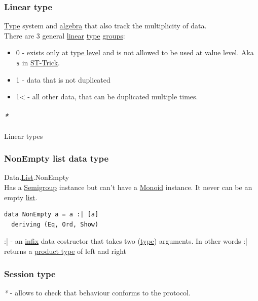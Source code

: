 \documentclass[11pt]{article}
\begin{document}
\subsubsection{\label{orge646ddd}Linear type}
\label{sec:org67a4dab}
\hyperref[orgc4aea2f]{Type} system and \hyperref[orgecfec51]{algebra} that also track the multiplicity of data.\\
There are 3 general \hyperref[orgbbe89e9]{linear} \hyperref[orgc4aea2f]{type} \hyperref[org734e757]{groups}:\\
\begin{itemize}
\item 0 - exists only at \hyperref[orgfe4cf3f]{type level} and is not allowed to be used at value level. Aka \texttt{s} in \hyperref[org61f073d]{ST-Trick}.\\
\item 1 - data that is not duplicated\\
\item 1< - all other data, that can be duplicated multiple times.\\
\end{itemize}

\paragraph{\emph{*}}
\label{sec:org14b06fe}

\label{org08f0ec8}Linear types\\

\subsubsection{\label{org4691374}NonEmpty list data type}
\label{sec:orgf2c694e}
Data.\hyperref[org874a6e0]{List}.NonEmpty\\
Has a \hyperref[org543a9ea]{Semigroup} instance but can't have a \hyperref[org37d140b]{Monoid} instance. It never can be an empty \hyperref[org874a6e0]{list}.\\

\begin{verbatim}
data NonEmpty a = a :| [a]
  deriving (Eq, Ord, Show)
\end{verbatim}

:| - an \hyperref[org3c7984a]{infix} data costructor that takes two (\hyperref[orgc4aea2f]{type}) arguments. In other words :| returns a \hyperref[org04c05d6]{product type} of left and right\\

\subsubsection{\label{orgc95f11e}Session type}
\label{sec:org8cdb240}
\emph{*} - allows to check that behaviour conforms to the protocol.\\
\end{document}
